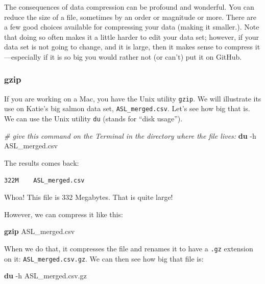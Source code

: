 \documentclass[]{book}
\newenvironment{Shaded}{\begin{snugshade}}{\end{snugshade}}
\newcommand{\KeywordTok}[1]{\textcolor[rgb]{0.13,0.29,0.53}{\textbf{{#1}}}}
\newcommand{\CommentTok}[1]{\textcolor[rgb]{0.56,0.35,0.01}{\textit{{#1}}}}
\newcommand{\NormalTok}[1]{{#1}}
\theoremstyle{definition}
\theoremstyle{definition}
\theoremstyle{remark}
\begin{document}
The consequences of data compression can be profound and wonderful. You
can reduce the size of a file, sometimes by an order or magnitude or
more. There are a few good choices available for compressing your data
(making it smaller.). Note that doing so often makes it a little harder
to edit your data set; however, if your data set is not going to change,
and it is large, then it makes sense to compress it---especially if it
is so big you would rather not (or can't) put it on GitHub.

\subsubsection{gzip}\label{gzip}

If you are working on a Mac, you have the Unix utility \texttt{gzip}. We
will illustrate its use on Katie's big salmon data set,
\texttt{ASL\_merged.csv}. Let's see how big that is. We can use the Unix
utility \texttt{du} (stands for ``disk usage'').

\begin{Shaded}
\begin{Highlighting}[]
\CommentTok{# give this command on the Terminal in the directory where the file lives:}
\KeywordTok{du} \NormalTok{-h ASL_merged.csv }
\end{Highlighting}
\end{Shaded}

The results comes back:

\begin{verbatim}
322M    ASL_merged.csv
\end{verbatim}

Whoa! This file is 332 Megabytes. That is quite large!

However, we can compress it like this:

\begin{Shaded}
\begin{Highlighting}[]
\KeywordTok{gzip} \NormalTok{ASL_merged.csv }
\end{Highlighting}
\end{Shaded}

When we do that, it compresses the file and renames it to have a
\texttt{.gz} extension on it: \texttt{ASL\_merged.csv.gz}. We can then
see how big that file is:

\begin{Shaded}
\begin{Highlighting}[]
\KeywordTok{du} \NormalTok{-h ASL_merged.csv.gz }
\end{Highlighting}
\end{Shaded}
\end{document}

